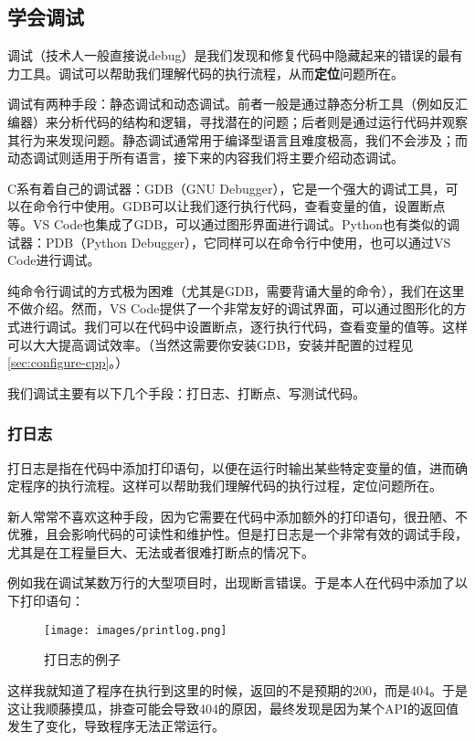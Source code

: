 \documentclass[../main.tex]{subfiles}
\begin{document}
\subsection{学会调试}\label{subsec:debugging}

调试（技术人一般直接说debug）是我们发现和修复代码中隐藏起来的错误的最有力工具。调试可以帮助我们理解代码的执行流程，从而\textbf{定位}问题所在。

调试有两种手段：静态调试和动态调试。前者一般是通过静态分析工具（例如反汇编器）来分析代码的结构和逻辑，寻找潜在的问题；后者则是通过运行代码并观察其行为来发现问题。静态调试通常用于编译型语言且难度极高，我们不会涉及；而动态调试则适用于所有语言，接下来的内容我们将主要介绍动态调试。

C系有着自己的调试器：GDB（GNU Debugger），它是一个强大的调试工具，可以在命令行中使用。GDB可以让我们逐行执行代码，查看变量的值，设置断点等。VS Code也集成了GDB，可以通过图形界面进行调试。Python也有类似的调试器：PDB（Python Debugger），它同样可以在命令行中使用，也可以通过VS Code进行调试。

纯命令行调试的方式极为困难（尤其是GDB，需要背诵大量的命令），我们在这里不做介绍。然而，VS Code提供了一个非常友好的调试界面，可以通过图形化的方式进行调试。我们可以在代码中设置断点，逐行执行代码，查看变量的值等。这样可以大大提高调试效率。（当然这需要你安装GDB，安装并配置的过程见\ref{sec:configure-cpp}。）

我们调试主要有以下几个手段：打日志、打断点、写测试代码。

\subsubsection{打日志}

打日志是指在代码中添加打印语句，以便在运行时输出某些特定变量的值，进而确定程序的执行流程。这样可以帮助我们理解代码的执行过程，定位问题所在。

新人常常不喜欢这种手段，因为它需要在代码中添加额外的打印语句，很丑陋、不优雅，且会影响代码的可读性和维护性。但是打日志是一个非常有效的调试手段，尤其是在工程量巨大、无法或者很难打断点的情况下。

例如我在调试某数万行的大型项目时，出现断言错误。于是本人在代码中添加了以下打印语句：

\begin{figure}[htbp]
\centering
\texttt{[image: images/printlog.png]}
\caption{打日志的例子}
\end{figure}

这样我就知道了程序在执行到这里的时候，返回的不是预期的200，而是404。于是这让我顺藤摸瓜，排查可能会导致404的原因，最终发现是因为某个API的返回值发生了变化，导致程序无法正常运行。
\end{document}
